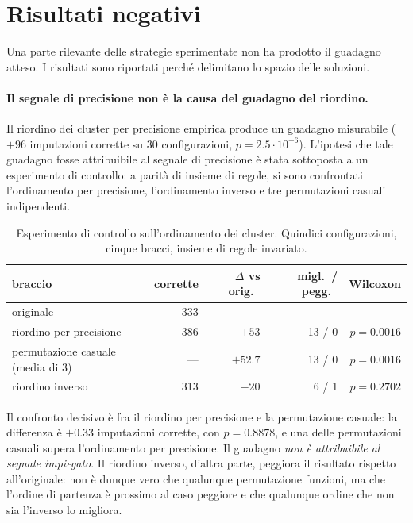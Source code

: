 \section{Risultati negativi}\label{sec:negative-results}

Una parte rilevante delle strategie sperimentate non ha prodotto il guadagno atteso. I risultati
sono riportati perché delimitano lo spazio delle soluzioni.

\paragraph{Il segnale di precisione non è la causa del guadagno del riordino.}
Il riordino dei cluster per precisione empirica produce un guadagno misurabile
($+96$ imputazioni corrette su \num{30} configurazioni, $p = 2.5\cdot 10^{-6}$). L'ipotesi che tale
guadagno fosse attribuibile al segnale di precisione è stata sottoposta a un esperimento di
controllo: a parità di insieme di regole, si sono confrontati l'ordinamento per precisione,
l'ordinamento inverso e tre permutazioni casuali indipendenti.

\begin{table}[htbp]
\centering
\caption{Esperimento di controllo sull'ordinamento dei cluster. Quindici configurazioni, cinque
bracci, insieme di regole invariato.}
\label{tab:res-order}
\footnotesize
\begin{tabular}{lrrrr}
\toprule
braccio & corrette & $\Delta$ vs orig.\ & migl.\ / pegg.\ & Wilcoxon \\
\midrule
originale                      & 333 & ---    & --- & --- \\
riordino per precisione        & 386 & $+53$  & 13 / 0 & $p = \num{0.0016}$ \\
permutazione casuale (media di 3) & --- & $+52.7$ & 13 / 0 & $p = \num{0.0016}$ \\
riordino inverso               & 313 & $-20$  & 6 / 1 & $p = \num{0.2702}$ \\
\bottomrule
\end{tabular}
\end{table}

Il confronto decisivo è fra il riordino per precisione e la permutazione casuale: la differenza è
$+0.33$ imputazioni corrette, con $p = \num{0.8878}$, e una delle permutazioni casuali supera
l'ordinamento per precisione. Il guadagno \emph{non è attribuibile al segnale impiegato}. Il
riordino inverso, d'altra parte, peggiora il risultato rispetto all'originale: non è dunque vero
che qualunque permutazione funzioni, ma che l'ordine di partenza è prossimo al caso peggiore e
che qualunque ordine che non sia l'inverso lo migliora.


